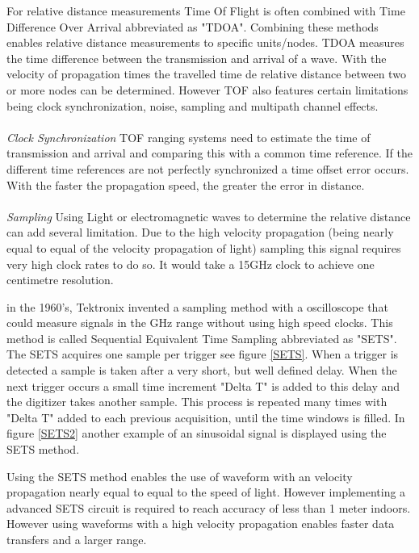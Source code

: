 \documentclass[10pt,a4paper]{article}
\begin{document}
For relative distance measurements Time Of Flight is often combined with Time Difference Over Arrival abbreviated as "TDOA". Combining these methods enables relative distance measurements to specific units/nodes. TDOA measures the time difference between the transmission and arrival of a wave. With the velocity of propagation times the travelled time de relative distance between two or more nodes can be determined. However TOF also features certain limitations being clock synchronization, noise, sampling and multipath channel effects.\cite{TOF} 
\\\\
\textit{Clock Synchronization}
TOF ranging systems need to estimate the time of transmission and arrival and comparing this with a common time reference.\cite{TOF} If the different time references are not perfectly synchronized a time offset error occurs. With the faster the propagation speed, the greater the error in distance. 
\\\\
\textit{Sampling}
Using Light or electromagnetic waves to determine the relative distance can add several limitation. Due to the high velocity propagation (being nearly equal to equal of the velocity propagation of light) sampling this signal requires very high clock rates to do so. It would take a 15GHz clock to achieve one centimetre resolution.\cite{Arduino}

in the 1960's, Tektronix invented a sampling method with a oscilloscope that could measure signals in the GHz range without using high speed clocks. This method is called Sequential Equivalent Time Sampling abbreviated as "SETS". The SETS acquires one sample per trigger see figure \ref{SETS}. When a trigger is detected a sample is taken after a very short, but well defined delay. When the next trigger occurs a small time increment "Delta T" is added to this delay and the digitizer takes another sample. This process is repeated many times with "Delta T" added to each previous acquisition, until the time windows is filled.\cite{SETS} In figure \ref{SETS2} another example of an sinusoidal signal is displayed using the SETS method. 

Using the SETS method enables the use of waveform with an velocity propagation nearly equal to equal to the speed of light. However implementing a advanced SETS circuit is required to reach accuracy of less than 1 meter indoors.\cite{TOF} However using waveforms with a high velocity propagation enables faster data transfers and a larger range.\cite{TOF}
\end{document}
